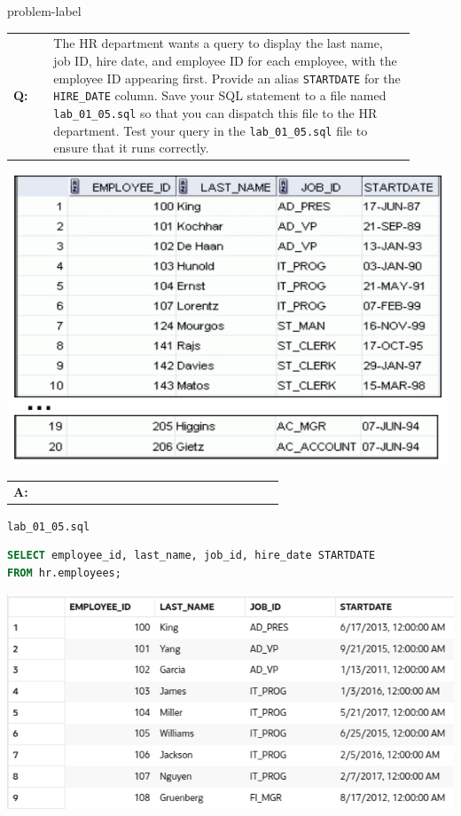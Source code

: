 \begin{problem}{}{problem-label}
\begin{tabular}{@{}l p{0.9\linewidth}@{}}
    \textbf{Q:} & The HR department wants a query to display the last name, job ID, hire date, and employee ID for each employee, with the employee ID appearing first. Provide an alias \texttt{STARTDATE} for the \texttt{HIRE\_DATE} column. Save your SQL statement to a file named \texttt{lab\_01\_05.sql} so that you can dispatch this file to the HR department.
    Test your query in the \texttt{lab\_01\_05.sql} file to ensure that it runs correctly.
\end{tabular}

\begin{center}
  \includegraphics[scale=0.7]{images/c1q06.png}
\end{center}

    \vspace{1em}
    \begin{tabular}{@{}l p{0.9\linewidth}@{}}
  \textbf{A:} &
\end{tabular}

\hspace{1.5em}\texttt{lab\_01\_05.sql}
\begin{lstlisting}[language=SQL]
SELECT employee_id, last_name, job_id, hire_date STARTDATE
FROM hr.employees;
\end{lstlisting}
    
\begin{center}
  \includegraphics[scale=0.5]{images/c1q6-1.png}
\end{center}
    
\end{problem}




